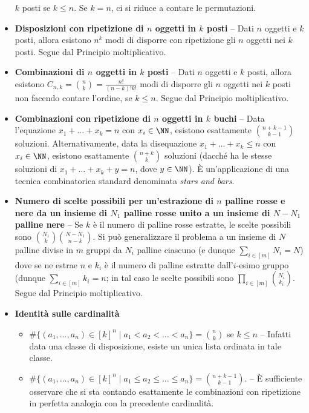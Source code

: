 \begin{multicols*}{2}
\begin{itemize}
    $k$ posti se $k \leq n$. Se $k = n$, ci si riduce a contare le permutazioni.
    \item \textbf{Disposizioni con ripetizione di $n$ oggetti in $k$ posti} -- Dati
    $n$ oggetti e $k$ posti, allora esistono $n^k$ modi di disporre con ripetizione gli $n$ oggetti
    nei $k$ posti. Segue dal Principio moltiplicativo.
    \item \textbf{Combinazioni di $n$ oggetti in $k$ posti} -- Dati $n$ oggetti
    e $k$ posti, allora esistono $C_{n,k} = \binom{n}{k} = \frac{n!}{(n-k)!k!}$ modi di disporre gli $n$ oggetti nei
    $k$ posti non facendo contare l'ordine, se $k \leq n$. Segue dal Principio
    moltiplicativo.
    \item \textbf{Combinazioni con ripetizione di $n$ oggetti in $k$ buchi} -- Data
    l'equazione $x_1 + \ldots + x_k = n$ con $x_i \in \NN$, esistono esattamente
    $\binom{n+k-1}{k-1}$ soluzioni. Alternativamente, data la disequazione
    $x_1 + \ldots + x_k \leq n$ con $x_i \in \NN$, esistono esattamente
    $\binom{n+k}{k}$ soluzioni (dacché ha le stesse soluzioni di
    $x_1 + \ldots + x_k + y = n$, dove $y \in \NN$). È un'applicazione di una
    tecnica combinatorica standard denominata \textit{stars and bars}.
    \item \textbf{Numero di scelte possibili per un'estrazione di $n$ palline rosse e nere da un insieme di $N_1$ palline rosse unito a un insieme di $N-N_1$ palline nere} -- Se $k$ è il numero di palline rosse estratte, le scelte possibili sono
    $\binom{N_1}{k} \binom{N - N_1}{n-k}$. Si può generalizzare il problema a
    un insieme di $N$ palline divise in $m$ gruppi da $N_i$ palline ciascuno
    (e dunque $\sum_{i \in [m]} N_i = N$) dove se ne estrae $n$ e $k_i$ è il
    numero di palline estratte dall'$i$-esimo gruppo (dunque $\sum_{i \in [m]} k_i = n$;
    in tal caso le scelte possibili sono $\prod_{i \in [m]} \binom{N_i}{k_i}$. Segue
    dal Principio moltiplicativo.
    \item \textbf{Identità sulle cardinalità}
\begin{itemize}
    \item $\#\{(a_1, \ldots, a_n) \in [k]^n \mid a_1 < a_2 < \ldots < a_n\} = \binom{n}{k}$ se $k \leq n$ -- Infatti data una classe di disposizione, esiste un unica lista ordinata
    in tale classe.
    \item $\#\{(a_1, \ldots, a_n) \in [k]^n \mid a_1 \leq a_2 \leq \ldots \leq a_n\} = \binom{n + k - 1}{k - 1}$. -- È sufficiente osservare che si sta
    contando esattamente le combinazioni con ripetizione in perfetta analogia con la precedente
    cardinalità.
\end{itemize}
\end{itemize}


\end{multicols*}
